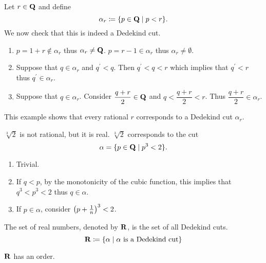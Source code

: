 \begin{example}
Let $r\in\mathbf Q$ and define
\[ \alpha_r\coloneqq\{p\in\mathbf Q\mid p<r\}. \]
We now check that this is indeed a Dedekind cut.
\begin{enumerate}[label=(\arabic*)]
\item $p=1+r\notin\alpha_r$ thus $\alpha_r\neq\mathbf Q$. $p=r-1\in\alpha_r$ thus $\alpha_r\neq\emptyset$.

\item Suppose that $q\in\alpha_r$ and $q^\prime<q$. Then $q^\prime<q<r$ which implies that $q^\prime<r$ thus $q^\prime\in\alpha_r$.

\item Suppose that $q\in\alpha_r$. Consider $\dfrac{q+r}{2}\in\mathbf Q$ and $q<\dfrac{q+r}{2}<r$. Thus $\dfrac{q+r}{2}\in\alpha_r$.
\end{enumerate}
\end{example}

This example shows that every rational $r$ corresponds to a Dedekind cut $\alpha_r$.

\begin{example}
$\sqrt[3]{2}$ is not rational, but it is real. $\sqrt[3]{2}$ corresponds to the cut
\[ \alpha=\{p\in\mathbf Q\mid p^3<2\}. \]
\begin{enumerate}[label=(\arabic*)]
\item Trivial.
\item If $q<p$, by the monotonicity of the cubic function, this implies that $q^3<p^3<2$ thus $q\in\alpha$.
\item If $p\in\alpha$, consider $\left(p+\frac{1}{n}\right)^3<2$.
\end{enumerate}
\end{example}

\begin{definition}
The set of real numbers, denoted by $\mathbf R$, is the set of all Dedekind cuts.
\[ \mathbf R\coloneqq\{\alpha\mid\alpha\text{ is a Dedekind cut}\} \]
\end{definition}

\begin{proposition}
$\mathbf R$ has an order.
\end{proposition}

